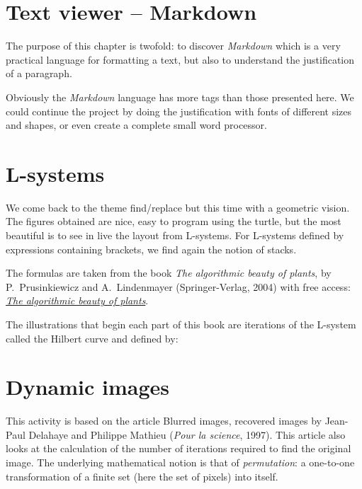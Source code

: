 \documentclass[11pt,class=report,crop=false]{standalone}
\begin{document}
\section{Text viewer -- Markdown}

The purpose of this chapter is twofold: to discover \emph{Markdown} which is a very practical language for formatting a text, but also to understand the justification of a paragraph.

Obviously the \emph{Markdown} language has more tags than those presented here. We could continue the project by doing the justification with fonts of different sizes and shapes, or even create a complete small word processor.


\section{L-systems}

We come back to the theme \og{}find/replace\fg{} but this time with a geometric vision. The figures obtained are nice, easy to program using the turtle, but the most beautiful is to see in live the layout from L-systems.
For L-systems defined by expressions containing brackets, we find again the notion of stacks. 

The formulas are taken from the book \emph{The algorithmic beauty of plants}, by 
P.~Prusinkiewicz and A.~Lindenmayer (Springer-Verlag, 2004) with free access:
\href{http://algorithmicbotany.org/papers/abop/abop.pdf}{\emph{The algorithmic beauty of plants}}.

The illustrations that begin each part of this book are iterations of the L-system called the Hilbert curve and defined by:


\section{Dynamic images}


This activity is based on the article \og{}Blurred images, recovered images\fg{} by Jean-Paul Delahaye and Philippe Mathieu (\emph{Pour la science}, 1997). This article also looks at the calculation of the number of iterations required to find the original image. The underlying mathematical notion is that of \emph{permutation}: a one-to-one transformation of a finite set (here the set of pixels) into itself.
\end{document}
